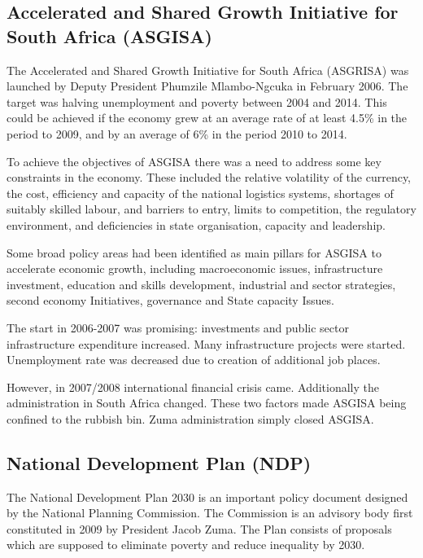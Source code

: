 \documentclass{elsarticle}
\begin{document}
\subsection{Accelerated and Shared Growth Initiative for South Africa (ASGISA)}	
The Accelerated and Shared Growth Initiative for South Africa (ASGRISA) was launched by Deputy President Phumzile Mlambo-Ngcuka in February 2006. The target was halving unemployment and poverty between 2004 and 2014. This could be achieved if the economy grew at an average rate of at least 4.5\% in the period to 2009, and by an average of 6\% in the period 2010 to 2014.

To achieve the objectives of ASGISA there was a need to address some key constraints in the economy. These included the relative volatility of the currency, the cost, efficiency and capacity of the national logistics systems, shortages of suitably skilled labour, and barriers to entry, limits to competition, the regulatory environment, and deficiencies in state organisation, capacity and leadership.
 
Some broad policy areas had been identified as main pillars for ASGISA to accelerate economic growth, including macroeconomic issues, infrastructure investment, education and skills development, industrial and sector strategies, second economy Initiatives, governance and State capacity Issues.

The start in 2006-2007 was promising: investments and public sector infrastructure expenditure increased. Many infrastructure projects were started. Unemployment rate was decreased due to creation of additional job places.

However, in 2007/2008 international financial crisis came. Additionally the administration in South Africa changed. These two factors made ASGISA being confined to the rubbish bin. Zuma administration simply closed ASGISA.

\subsection{National Development Plan (NDP)}
The National Development Plan 2030 is an important policy document designed by the National Planning Commission. The Commission is an advisory body first constituted in 2009 by President Jacob Zuma. The Plan consists of proposals which are supposed to eliminate poverty and reduce inequality by 2030.
\end{document}

